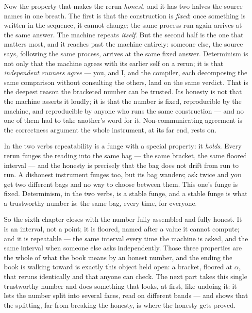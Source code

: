 Now the property that makes the rerun \emph{honest}, and it has two halves the source names in one breath. The first is
that the construction is \emph{fixed}: once something is written in the sequence, it cannot change; the same process
run again arrives at the same answer. The machine repeats \emph{itself}. But the second half is the one that matters
most, and it reaches past the machine entirely: someone else, the source says, following the same process, arrives at
the same fixed answer. Determinism is not only that the machine agrees with its earlier self on a rerun; it is that
\emph{independent runners agree} --- you, and I, and the compiler, each decomposing the same comparison without
consulting the others, land on the same verdict. That is the deepest reason the bracketed number can be trusted. Its
honesty is not that the machine asserts it loudly; it is that the number is fixed, reproducible by the machine, and
reproducible by anyone who runs the same construction --- and no one of them had to take another's word for it.
Non-communicating agreement is the correctness argument the whole instrument, at its far end, rests on.

In the two verbs repeatability is a funge with a special property: it \emph{holds}. Every rerun funges the reading
into the same bag --- the same bracket, the same floored interval --- and the honesty is precisely that the bag does
not drift from run to run. A dishonest instrument funges too, but its bag wanders; ask twice and you get two different
bags and no way to choose between them. This one's funge is fixed. Determinism, in the two verbs, is a stable funge,
and a stable funge is what a trustworthy number is: the same bag, every time, for everyone.

So the sixth chapter closes with the number fully assembled and fully honest. It is an interval, not a point; it is
floored, named after a value it cannot compute; and it is repeatable --- the same interval every time the machine is
asked, and the same interval when someone else asks independently. Those three properties are the whole of what the
book means by an honest number, and the ending the book is walking toward is exactly this object held open: a bracket,
floored at $\alpha$, that reruns identically and that anyone can check. The next part takes this single trustworthy
number and does something that looks, at first, like undoing it: it lets the number split into several faces, read on
different bands --- and shows that the splitting, far from breaking the honesty, is where the honesty gets proved.

